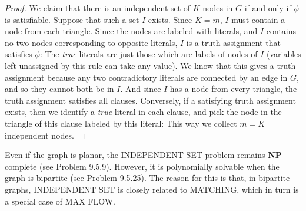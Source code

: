 \documentclass[12pt]{article}
\begin{document}
\begin{proof}
We claim that there is an independent set of $K$ nodes in $G$ if and only if $\phi$ is satisfiable. Suppose that such a set $I$ exists. Since $K = m$, $I$ must contain a node from each triangle. Since the nodes are labeled with literals, and $I$ contains no two nodes corresponding to opposite literals, $I$ is a truth assignment that satisfies $\phi$: The \textit{true} literals are just those which are labels of nodes of $I$ (variables left unassigned by this rule can take any value). We know that this gives a truth assignment because any two contradictory literals are connected by an edge in $G$, and so they cannot both be in $I$. And since $I$ has a node from every triangle, the truth assignment satisfies all clauses. Conversely, if a satisfying truth assignment exists, then we identify a \textit{true} literal in each clause, and pick the node in the triangle of this clause labeled by this literal: This way we collect $m = K$ independent nodes. 
\end{proof}
Even if the graph is planar, the \textsc{INDEPENDENT SET} problem remains \textbf{NP}-complete (see Problem 9.5.9). However, it is polynomially solvable when the graph is bipartite (see Problem 9.5.25). The reason for this is that, in bipartite graphs, \textsc{INDEPENDENT SET} is closely related to \textsc{MATCHING}, which in turn is a special case of \textsc{MAX FLOW}.
\end{document}
